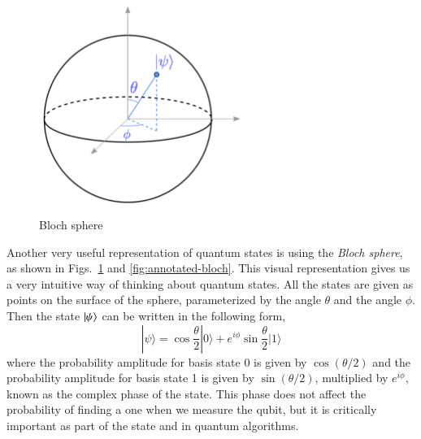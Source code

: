 \begin{figure}[H]
    \centering
    \includegraphics[width=0.6\textwidth]{lesson2/bloch_sphere.pdf}
    
        \caption{Bloch sphere}
    
    \label{fig:bloch}
\end{figure}

Another very useful representation of quantum states is using the \emph{Bloch sphere}, as shown in Figs.~\ref{fig:bloch} and \ref{fig:annotated-bloch}. This visual representation gives us a very intuitive way of thinking about quantum states. All the states are given as points on the surface of the sphere, parameterized by the angle $\theta$ and the angle $\phi$. Then the state $\left| \psi \right\rangle$ can be written in the following form,
\begin{equation}
|\psi\rangle=\cos \frac{\theta}{2}|0\rangle+e^{i \phi} \sin \frac{\theta}{2}|1\rangle
\end{equation}
where the probability amplitude for basis state 0 is given by $\cos(\theta/2)$ and the probability amplitude for basis state 1 is given by $\sin(\theta/2)$, multiplied by $e^{i \phi}$, known as the complex phase of the state. This phase does not affect the probability of finding a one when we measure the qubit, but it is critically important as part of the state and in quantum algorithms.

